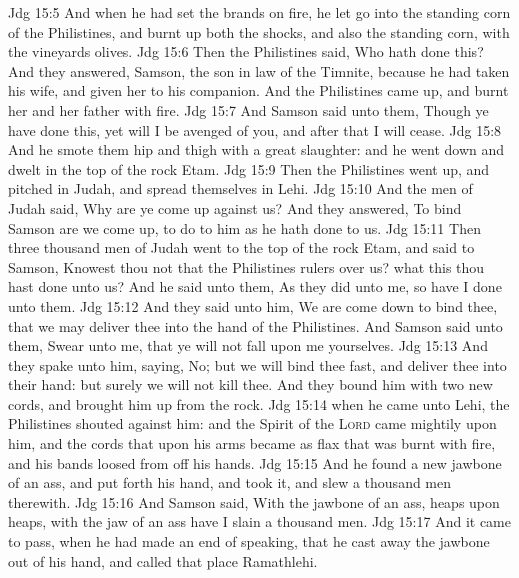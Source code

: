 \vs Jdg 15:5 And when he had set the brands on fire, he let  go into the standing corn of the Philistines, and burnt up both the shocks, and also the standing corn, with the vineyards  olives.
\vs Jdg 15:6 Then the Philistines said, Who hath done this? And they answered, Samson, the son in law of the Timnite, because he had taken his wife, and given her to his companion. And the Philistines came up, and burnt her and her father with fire.
\vs Jdg 15:7 And Samson said unto them, Though ye have done this, yet will I be avenged of you, and after that I will cease.
\vs Jdg 15:8 And he smote them hip and thigh with a great slaughter: and he went down and dwelt in the top of the rock Etam.
\vs Jdg 15:9 Then the Philistines went up, and pitched in Judah, and spread themselves in Lehi.
\vs Jdg 15:10 And the men of Judah said, Why are ye come up against us? And they answered, To bind Samson are we come up, to do to him as he hath done to us.
\vs Jdg 15:11 Then three thousand men of Judah went to the top of the rock Etam, and said to Samson, Knowest thou not that the Philistines  rulers over us? what  this  thou hast done unto us? And he said unto them, As they did unto me, so have I done unto them.
\vs Jdg 15:12 And they said unto him, We are come down to bind thee, that we may deliver thee into the hand of the Philistines. And Samson said unto them, Swear unto me, that ye will not fall upon me yourselves.
\vs Jdg 15:13 And they spake unto him, saying, No; but we will bind thee fast, and deliver thee into their hand: but surely we will not kill thee. And they bound him with two new cords, and brought him up from the rock.
\vs Jdg 15:14  when he came unto Lehi, the Philistines shouted against him: and the Spirit of the \textsc{Lord} came mightily upon him, and the cords that  upon his arms became as flax that was burnt with fire, and his bands loosed from off his hands.
\vs Jdg 15:15 And he found a new jawbone of an ass, and put forth his hand, and took it, and slew a thousand men therewith.
\vs Jdg 15:16 And Samson said, With the jawbone of an ass, heaps upon heaps, with the jaw of an ass have I slain a thousand men.
\vs Jdg 15:17 And it came to pass, when he had made an end of speaking, that he cast away the jawbone out of his hand, and called that place Ramathlehi.
